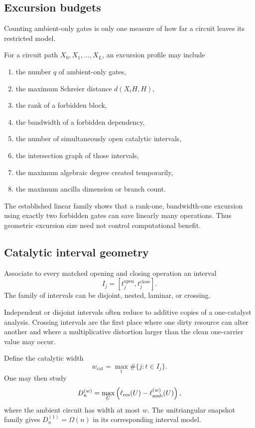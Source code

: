 \subsection{Excursion budgets}
Counting ambient-only gates is only one measure of how far a circuit leaves its restricted model.
\begin{definition}
For a circuit path $X_0,X_1,\ldots,X_L$, an excursion profile may include
\begin{enumerate}
\item the number $q$ of ambient-only gates,
\item the maximum Schreier distance $d(X_tH,H)$,
\item the rank of a forbidden block,
\item the bandwidth of a forbidden dependency,
\item the number of simultaneously open catalytic intervals,
\item the intersection graph of those intervals,
\item the maximum algebraic degree created temporarily,
\item the maximum ancilla dimension or branch count.
\end{enumerate}
\end{definition}
The established linear family shows that a rank-one, bandwidth-one excursion using exactly two forbidden gates can save linearly many operations.  Thus geometric excursion size need not control computational benefit.

\subsection{Catalytic interval geometry}
Associate to every matched opening and closing operation an interval
\[
I_j=[t_j^{\mathrm{open}},t_j^{\mathrm{close}}].
\]
The family of intervals can be disjoint, nested, laminar, or crossing.

\begin{principle}
Independent or disjoint intervals often reduce to additive copies of a one-catalyst analysis.  Crossing intervals are the first place where one dirty resource can alter another and where a multiplicative distortion larger than the clean one-carrier value may occur.
\end{principle}

Define the catalytic width
\[
w_{\mathrm{cat}}=
\max_t
\#\{j:t\in I_j\}.
\]
One may then study
\[
D_n^{(w)}
=
\max_{U}
\left(
\ell_{\mathrm{res}}(U)-\ell_{\mathrm{amb}}^{(w)}(U)
\right),
\]
where the ambient circuit has width at most $w$.  The unitriangular snapshot family gives $D_n^{(1)}=\Omega(n)$ in its corresponding interval model.


